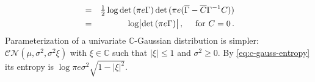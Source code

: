 \documentclass[a4paper,10pt,twocolumn]{article}
\newcommand{\cplx}{\mathbb{C}}
\newcommand{\conj}[1]{\overline{#1}}
\begin{document}
\begin{eqnarray}
    &=&
      \tfrac12 \log \det{(\pi e \Gamma)}
      \det{(\pi e (\conj{\Gamma} - \conj{C} \Gamma^{-1} C))}
    \notag \\
    &=&
      \log \bigl\lvert \det{(\pi e \Gamma)} \bigr\rvert
      \,, \quad \text{ for } C = 0
    \,.
    \notag
\end{eqnarray}
%
Parameterization of a univariate $\cplx$-Gaussian distribution is simpler: $
  \mathcal{CN}(\mu, \sigma^2, \sigma^2 \xi)
$ with $\xi \in \cplx$ such that $\lvert \xi \rvert \leq 1$ and $\sigma^2 \geq 0$.
By \eqref{eq:c-gauss-entropy} its entropy is $
  \log \pi e \sigma^2 \sqrt{1 - \lvert \xi \rvert^2}
$.
\end{document}
